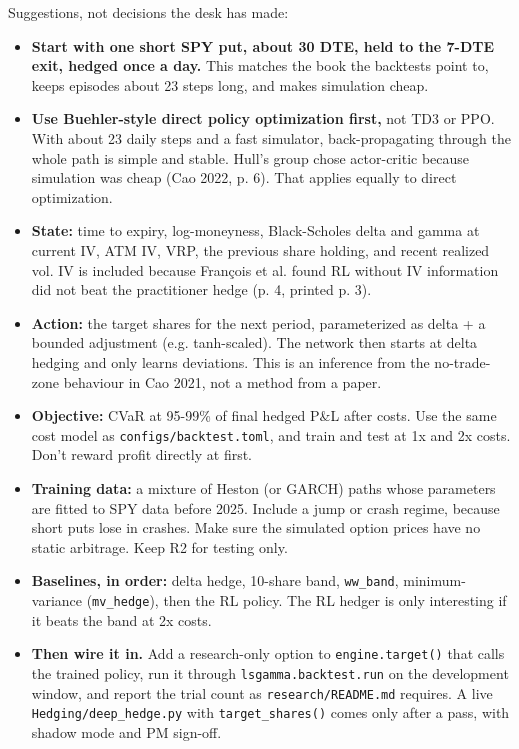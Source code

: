 \documentclass{article}
\begin{document}
Suggestions, not decisions the desk has made:

\begin{itemize}

\item \textbf{Start with one short SPY put, about 30 DTE, held to the 7-DTE exit, hedged once a day.} This matches the book the backtests point to, keeps episodes about 23 steps long, and makes simulation cheap.

\item \textbf{Use Buehler-style direct policy optimization first,} not TD3 or PPO. With about 23 daily steps and a fast simulator, back-propagating through the whole path is simple and stable. Hull's group chose actor-critic because simulation was cheap (Cao 2022, p. 6). That applies equally to direct optimization.

\item \textbf{State:} time to expiry, log-moneyness, Black-Scholes delta and gamma at current IV, ATM IV, VRP, the previous share holding, and recent realized vol. IV is included because François et al. found RL without IV information did not beat the practitioner hedge (p. 4, printed p. 3).

\item \textbf{Action:} the target shares for the next period, parameterized as delta + a bounded adjustment (e.g. tanh-scaled). The network then starts at delta hedging and only learns deviations. This is an inference from the no-trade-zone behaviour in Cao 2021, not a method from a paper.

\item \textbf{Objective:} CVaR at 95-99\% of final hedged P\&L after costs. Use the same cost model as \texttt{configs/\allowbreak{}backtest.\allowbreak{}toml}, and train and test at 1x and 2x costs. Don't reward profit directly at first.

\item \textbf{Training data:} a mixture of Heston (or GARCH) paths whose parameters are fitted to SPY data before 2025. Include a jump or crash regime, because short puts lose in crashes. Make sure the simulated option prices have no static arbitrage. Keep R2 for testing only.

\item \textbf{Baselines, in order:} delta hedge, 10-share band, \texttt{ww\_\allowbreak{}band}, minimum-variance (\texttt{mv\_\allowbreak{}hedge}), then the RL policy. The RL hedger is only interesting if it beats the band at 2x costs.

\item \textbf{Then wire it in.} Add a research-only option to \texttt{engine.\allowbreak{}target()} that calls the trained policy, run it through \texttt{lsgamma.\allowbreak{}backtest.\allowbreak{}run} on the development window, and report the trial count as \texttt{research/\allowbreak{}README.\allowbreak{}md} requires. A live \texttt{Hedging/\allowbreak{}deep\_\allowbreak{}hedge.\allowbreak{}py} with \texttt{target\_\allowbreak{}shares()} comes only after a pass, with shadow mode and PM sign-off.

\end{itemize}
\end{document}
